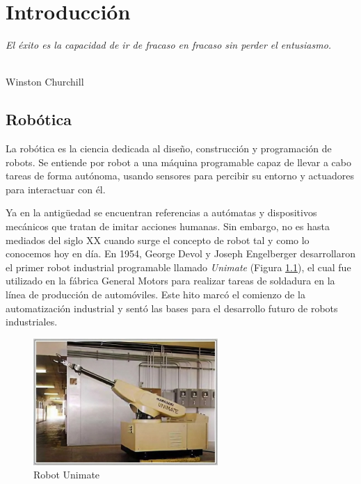 \chapter{Introducción}
\label{cap:capitulo1}
\setcounter{page}{1}

\begin{flushright}
\begin{minipage}[]{10cm}
\emph{El éxito es la capacidad de ir de fracaso en fracaso sin perder el entusiasmo.}\\
\end{minipage}\\

Winston Churchill\\
\end{flushright}


\section{Robótica}
\label{sec:rob}
\noindent La robótica es la ciencia dedicada al diseño, construcción y programación de robots. Se entiende por 
robot a una máquina programable capaz de llevar a cabo tareas de forma autónoma, usando sensores para percibir su entorno y 
actuadores para interactuar con él.

Ya en la antigüedad se encuentran referencias a autómatas y dispositivos mecánicos  
que tratan de imitar acciones humanas. Sin embargo, no es hasta mediados del siglo XX cuando surge el concepto de robot tal y como lo conocemos hoy en día. 
En 1954, George Devol y Joseph Engelberger desarrollaron el primer robot industrial programable llamado \textit{Unimate} (Figura \ref{fig:unimate}), el cual fue utilizado en la fábrica General Motors 
para realizar tareas de soldadura en la línea de producción de automóviles. Este hito marcó el comienzo de la automatización industrial y sentó las bases para 
el desarrollo futuro de robots industriales.\\
\begin{figure} [ht!]
  \begin{center}
    \includegraphics[width=7cm]{figs/unimate.jpg}
  \end{center}
  \caption{Robot Unimate}
  \label{fig:unimate}
\end{figure}\ 

